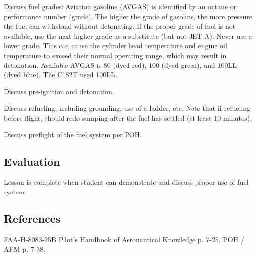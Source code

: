 Discuss fuel grades: Aviation gasoline (AVGAS) is identified by an octane or
performance number (grade). The higher the grade of gasoline, the more pressure
the fuel can withstand without detonating. If the proper grade of fuel is not
available, use the next higher grade as a substitute (but not JET A). Never use
a lower grade. This can cause the cylinder head temperature and engine oil
temperature to exceed their normal operating range, which may result in
detonation. Available AVGAS is 80 (dyed red), 100 (dyed green), and 100LL (dyed
blue). The C182T used 100LL.

Discuss pre-ignition and detonation.

Discuss refueling, including grounding, use of a ladder, etc. Note that if
refueling before flight, should redo sumping after the fuel has settled (at
least 10 minutes).

Discuss preflight of the fuel system per POH.

\subsection{Evaluation}

Lesson is complete when student can demonstrate and discuss proper use of fuel
system.

\subsection{References}

FAA-H-8083-25B Pilot's Handbook of Aeronautical Knowledge p. 7-25, POH / AFM p.
7-38.
